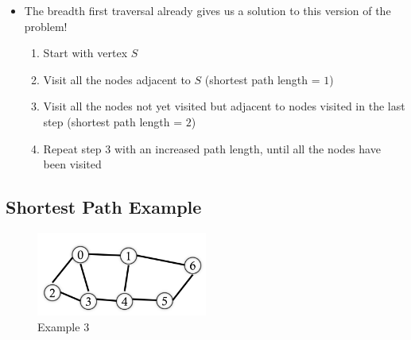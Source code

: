 \documentclass[
  10pt,
  english,
  letterpaper,
,tablecaptionabove
]{scrartcl}
\providecommand{\tightlist}{%
  \setlength{\itemsep}{0pt}\setlength{\parskip}{0pt}}
\begin{document}
\begin{itemize}
\tightlist
\item
  The breadth first traversal already gives us a solution to this
  version of the problem!

  \begin{enumerate}
  \def\labelenumi{\arabic{enumi}.}
  \tightlist
  \item
    Start with vertex \(S\)
  \item
    Visit all the nodes adjacent to \(S\) (shortest path length = \(1\))
  \item
    Visit all the nodes not yet visited but adjacent to nodes visited in
    the last step (shortest path length = \(2\))
  \item
    Repeat step 3 with an increased path length, until all the nodes
    have been visited
  \end{enumerate}
\end{itemize}

\hypertarget{shortest-path-example}{%
\subsection{Shortest Path Example}\label{shortest-path-example}}

\begin{figure}
\centering
\includegraphics[width=0.5\textwidth,height=\textheight]{images/3.png}
\caption{Example 3}
\end{figure}
\end{document}
